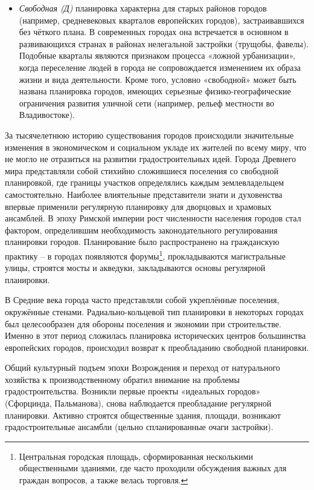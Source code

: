 \documentclass[
  11pt,
]{book}
\begin{document}
\begin{itemize}
\item
  \emph{Свободная (Д)} планировка характерна для старых районов городов (например, средневековых кварталов европейских городов), застраивавшихся без чёткого плана. В современных городах она встречается в основном в развивающихся странах в районах нелегальной застройки (трущобы, фавелы). Подобные кварталы являются признаком процесса «ложной урбанизации», когда переселение людей в города не сопровождается изменением их образа жизни и вида деятельности. Кроме того, условно «свободной» может быть названа планировка городов, имеющих серьезные физико-географические ограничения развития уличной сети (например, рельеф местности во Владивостоке).
\end{itemize}

За тысячелетнюю историю существования городов происходили значительные изменения в экономическом и социальном укладе их жителей по всему миру, что не могло не отразиться на развитии градостроительных идей. Города Древнего мира представляли собой стихийно сложившиеся поселения со
свободной планировкой, где границы участков определялись каждым землевладельцем самостоятельно. Наиболее влиятельные представители знати и духовенства впервые применили регулярную планировку для дворцовых и храмовых ансамблей. В эпоху Римской империи рост численности населения городов стал фактором, определившим необходимость законодательного регулирования планировки городов. Планирование было распространено на гражданскую практику -- в городах появляются форумы\footnote{Центральная городская площадь, сформированная несколькими общественными зданиями, где часто проходили обсуждения важных для граждан вопросов, а также велась торговля.}, прокладываются магистральные улицы, строятся мосты и акведуки, закладываются основы регулярной планировки.

В Средние века города часто представляли собой укреплённые поселения, окружённые стенами. Радиально-кольцевой тип планировки в некоторых городах был целесообразен для обороны поселения и экономии при строительстве. Именно в этот период сложилась планировка исторических центров большинства европейских городов, происходил возврат к преобладанию свободной планировки.

Общий культурный подъем эпохи Возрождения и переход от натурального хозяйства к производственному обратил внимание на проблемы градостроительства. Возникли первые проекты «идеальных городов» (Сфорцинда, Пальманова), снова наблюдается преобладание регулярной планировки. Активно строятся общественные здания, площади, возникают градостроительные ансамбли (цельно спланированные очаги застройки).
\end{document}
